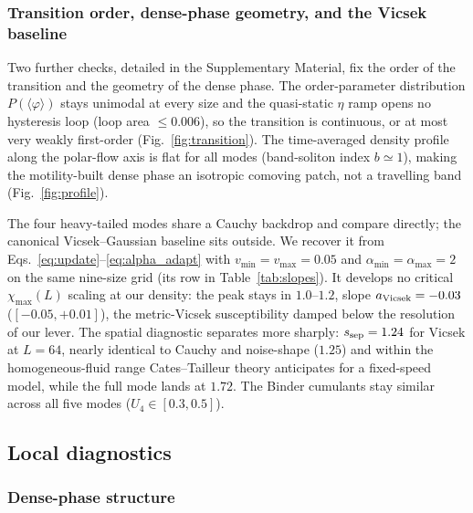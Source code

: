 \documentclass[11pt,a4paper]{article}
\begin{document}
\subsubsection{Transition order, dense-phase geometry, and the Vicsek baseline}
\label{sec:gauss-ref}

Two further checks, detailed in the Supplementary Material, fix
the order of the transition and the geometry of the dense phase.
The order-parameter distribution $P(\langle\varphi\rangle)$
stays unimodal at every size and the quasi-static $\eta$ ramp
opens no hysteresis loop (loop area $\le 0.006$), so the
transition is continuous, or at most very weakly first-order
(Fig.~\ref{fig:transition}). The time-averaged density profile
along the polar-flow axis is flat for all modes (band-soliton
index $b \simeq 1$), making the motility-built dense phase an
isotropic comoving patch, not a travelling band
(Fig.~\ref{fig:profile}).

The four heavy-tailed modes share a Cauchy backdrop and compare
directly; the canonical Vicsek--Gaussian baseline sits outside.
We recover it from Eqs.~\eqref{eq:update}--\eqref{eq:alpha_adapt}
with $v_{\min} = v_{\max} = 0.05$ and $\alpha_{\min} =
\alpha_{\max} = 2$ on the same nine-size grid (its row in
Table~\ref{tab:slopes}). It develops no critical $\chi_{\max}(L)$
scaling at our density: the peak stays in $1.0$--$1.2$, slope
$a_{\rm Vicsek} = -0.03$ ($[-0.05, +0.01]$), the metric-Vicsek
susceptibility damped below the resolution of our lever. The
spatial diagnostic separates more sharply: $s_{\rm sep} = 1.24$
for Vicsek at $L = 64$, nearly identical to Cauchy and
noise-shape ($1.25$) and within the homogeneous-fluid range
Cates--Tailleur theory anticipates for a fixed-speed model,
while the full mode lands at $1.72$. The Binder cumulants stay
similar across all five modes ($U_4 \in [0.3, 0.5]$).

\subsection{Local diagnostics}
\label{sec:results-local}

\subsubsection{Dense-phase structure}
\label{sec:clusters}
\end{document}
